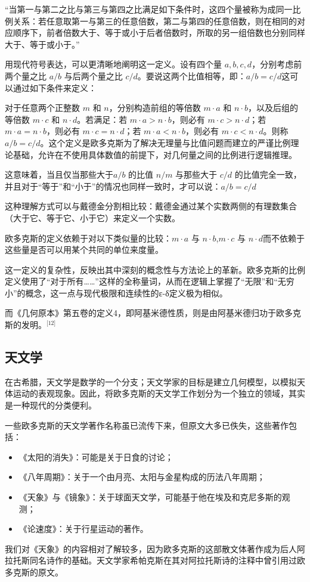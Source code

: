 “当第一与第二之比与第三与第四之比满足如下条件时，这四个量被称为成同一比例关系：若任意取第一与第三的任意倍数，第二与第四的任意倍数，则在相同的对应顺序下，前者倍数大于、等于或小于后者倍数时，所取的另一组倍数也分别同样大于、等于或小于。”

用现代符号表达，可以更清晰地阐明这一定义。设有四个量 $a, b, c, d$，分别考虑前两个量之比 $a/b$ 与后两个量之比 $c/d$。要说这两个比值相等，即：$a/b = c/d$这可以通过如下条件来定义：

对于任意两个正整数 $m$ 和 $n$，分别构造前组的等倍数 $m \cdot a$ 和 $n \cdot b$，以及后组的等倍数 $m \cdot c$ 和 $n \cdot d$。若满足：若 $m \cdot a > n \cdot b$，则必有 $m \cdot c > n \cdot d$；若 $m \cdot a = n \cdot b$，则必有 $m \cdot c = n \cdot d$；若 $m \cdot a < n \cdot b$，则必有 $m \cdot c < n \cdot d$。则称 $a/b = c/d$。这个定义是欧多克斯为了解决无理量与比值问题而建立的严谨比例理论基础，允许在不使用具体数值的前提下，对几何量之间的比例进行逻辑推理。

这意味着，当且仅当那些大于$a/b$ 的比值 $n/m$ 与那些大于 $c/d$ 的比值完全一致，并且对于“等于”和“小于”的情况也同样一致时，才可以说：$a/b = c/d$

这种理解方式可以与戴德金分割相比较：戴德金通过某个实数两侧的有理数集合（大于它、等于它、小于它）来定义一个实数。

欧多克斯的定义依赖于对以下类似量的比较：$m \cdot a$ 与 $n \cdot b$,$m \cdot c$ 与 $n \cdot d$而不依赖于这些量是否可以用某个共同的单位来度量。

这一定义的复杂性，反映出其中深刻的概念性与方法论上的革新。欧多克斯的比例定义使用了“对于所有……”这样的全称量词，从而在逻辑上掌握了“无限”和“无穷小”的概念，这一点与现代极限和连续性的ε-δ定义极为相似。

而《几何原本》第五卷的定义4，即阿基米德性质，则是由阿基米德归功于欧多克斯的发明。\(^\text{[12]}\)
\subsection{天文学}
在古希腊，天文学是数学的一个分支；天文学家的目标是建立几何模型，以模拟天体运动的表观现象。因此，将欧多克斯的天文学工作划分为一个独立的领域，其实是一种现代的分类便利。

一些欧多克斯的天文学著作名称虽已流传下来，但原文大多已佚失，这些著作包括：
\begin{itemize}
\item 《太阳的消失》：可能是关于日食的讨论；
\item 《八年周期》：关于一个由月亮、太阳与金星构成的历法八年周期；
\item 《天象》与《镜象》：关于球面天文学，可能基于他在埃及和克尼多斯的观测；
\item 《论速度》：关于行星运动的著作。
\end{itemize}
我们对《天象》的内容相对了解较多，因为欧多克斯的这部散文体著作成为后人阿拉托斯同名诗作的基础。天文学家希帕克斯在其对阿拉托斯诗的注释中曾引用过欧多克斯的原文。
